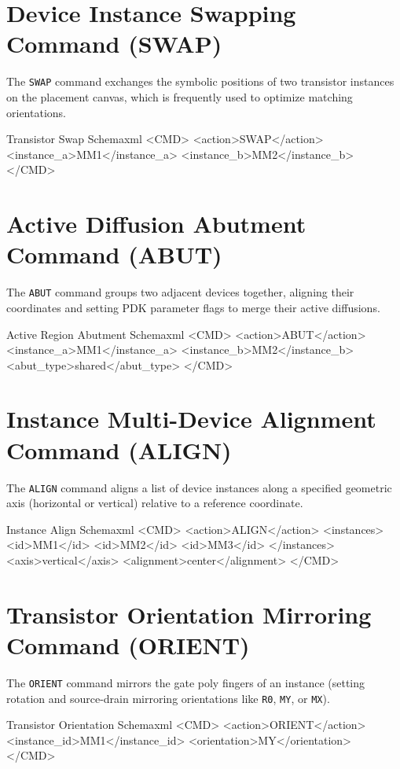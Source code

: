\section{Device Instance Swapping Command (SWAP)}
\noindent
The \texttt{SWAP} command exchanges the symbolic positions of two transistor instances on the placement canvas, which is frequently used to optimize matching orientations.
\begin{thesiscode}{Transistor Swap Schema}{xml}
<CMD>
  <action>SWAP</action>
  <instance_a>MM1</instance_a>
  <instance_b>MM2</instance_b>
</CMD>
\end{thesiscode}

\section{Active Diffusion Abutment Command (ABUT)}
\noindent
The \texttt{ABUT} command groups two adjacent devices together, aligning their coordinates and setting PDK parameter flags to merge their active diffusions.
\begin{thesiscode}{Active Region Abutment Schema}{xml}
<CMD>
  <action>ABUT</action>
  <instance_a>MM1</instance_a>
  <instance_b>MM2</instance_b>
  <abut_type>shared</abut_type>
</CMD>
\end{thesiscode}

\section[Multi-Device Alignment (ALIGN)]{Instance Multi-Device Alignment\\Command (ALIGN)}
\noindent
The \texttt{ALIGN} command aligns a list of device instances along a specified geometric axis (horizontal or vertical) relative to a reference coordinate.
\begin{thesiscode}{Instance Align Schema}{xml}
<CMD>
  <action>ALIGN</action>
  <instances>
    <id>MM1</id>
    <id>MM2</id>
    <id>MM3</id>
  </instances>
  <axis>vertical</axis>
  <alignment>center</alignment>
</CMD>
\end{thesiscode}

\section{Transistor Orientation Mirroring Command (ORIENT)}
\noindent
The \texttt{ORIENT} command mirrors the gate poly fingers of an instance (setting rotation and source-drain mirroring orientations like \texttt{R0}, \texttt{MY}, or \texttt{MX}).
\begin{thesiscode}{Transistor Orientation Schema}{xml}
<CMD>
  <action>ORIENT</action>
  <instance_id>MM1</instance_id>
  <orientation>MY</orientation>
</CMD>
\end{thesiscode}

